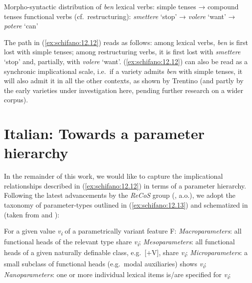 \documentclass[output=paper]{langsci/langscibook}
\begin{document}
\ea\label{ex:schifano:12.12} Morpho-syntactic distribution of \emph{ben}
	\ea lexical verbs: simple tenses → compound tenses
    \ex functional verbs (cf.\ restructuring): \emph{smettere} ‘stop’ →
        \emph{volere} ‘want’ → \emph{potere} ‘can’
	\z
\z

The path in (\ref{ex:schifano:12.12}) reads as follows: among lexical verbs, \emph{ben} is first
lost with simple tenses; among restructuring verbs, it is first lost with
\emph{smettere} ‘stop’ and, partially, with \emph{volere} ‘want’. (\ref{ex:schifano:12.12}) can also
be read as a synchronic implicational scale, i.e.\ if a variety admits
\emph{ben} with simple tenses, it will also admit it in all the other contexts,
as shown by Trentino (and partly by the early varieties under investigation
here, pending further research on a wider corpus).

\section{Italian: Towards a parameter hierarchy}\label{sec:23-hierarchy}

In the remainder of this work, we would like to capture the implicational
relationships described in (\ref{ex:schifano:12.12}) in terms of a parameter hierarchy. Following
the latest advancements by the \emph{ReCoS} group
(\citealt{Roberts2012,BibRob2012,BibRob2015,BibRob2016,BibHolRobShee2014,BibRobShee2014},
a.o.), we adopt the taxonomy of parameter-types outlined in (\ref{ex:schifano:12.13}) and
schematized in  (taken from \citealt{BibRob2012} and
\citealt{BibRob2016}):

\ea\label{ex:schifano:12.13} For a given value \emph{v\textsubscript{i}} of a parametrically variant feature F:
	\ea \textit{Macroparameters}: all functional heads of the relevant type share \emph{v\textsubscript{i}};
	\ex \textit{Mesoparameters}: all functional heads of a
    given naturally definable class, e.g.\ [$+$V], share \emph{v\textsubscript{i}};
	\ex \textit{Microparameters}: a small subclass of functional heads (e.g.\ modal auxiliaries) shows \emph{v\textsubscript{i}};
	\ex \textit{Nanoparameters}: one or more individual lexical items is/are specified for \emph{v\textsubscript{i}};
	\z
\z
\end{document}
